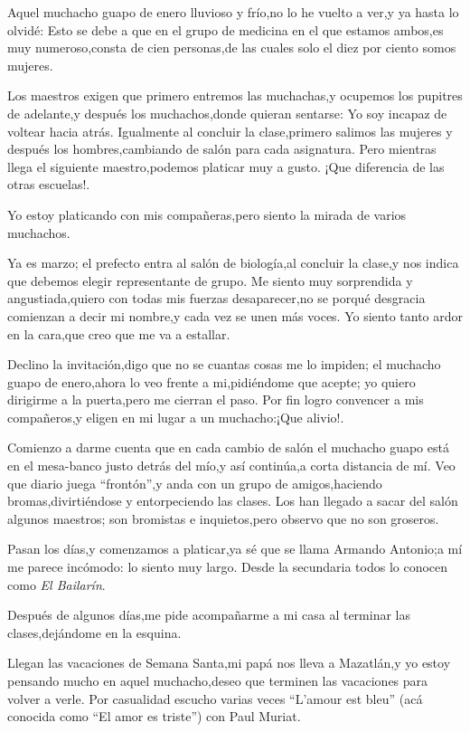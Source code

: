 \documentclass[letterpaper,12pt]{book}
\begin{document}
Aquel muchacho guapo de enero lluvioso y frío,no lo he vuelto a ver,y ya hasta lo olvidé: Esto se debe a que en el grupo de medicina en el que estamos ambos,es muy numeroso,consta de cien personas,de las cuales solo el diez por ciento somos mujeres.

Los maestros exigen que primero entremos las muchachas,y ocupemos los pupitres de adelante,y después los muchachos,donde quieran sentarse: Yo soy incapaz de voltear hacia atrás. Igualmente al concluir la clase,primero salimos las mujeres y después los hombres,cambiando de salón para cada asignatura. Pero mientras llega el siguiente maestro,podemos platicar muy a gusto. ¡Que diferencia de las otras escuelas!. 

Yo estoy platicando con mis compañeras,pero siento la mirada de varios muchachos.

Ya es marzo; el prefecto entra al salón de biología,al concluir la clase,y nos indica que debemos elegir representante de grupo. Me siento muy sorprendida y angustiada,quiero con todas mis fuerzas desaparecer,no se porqué desgracia comienzan a decir mi nombre,y cada vez se unen más voces. Yo siento tanto ardor en la cara,que creo que me va a estallar.

Declino la invitación,digo que no se cuantas cosas me lo impiden; el muchacho guapo de enero,ahora lo veo frente a mi,pidiéndome que acepte; yo quiero dirigirme a la puerta,pero me cierran el paso. Por fin logro convencer a mis compañeros,y eligen en mi lugar a un muchacho:¡Que alivio!.

Comienzo a darme cuenta que en cada cambio de salón el muchacho guapo está en el mesa-banco justo detrás del mío,y así continúa,a corta distancia de mí. Veo que diario juega ``frontón'',y anda con un grupo de amigos,haciendo bromas,divirtiéndose y entorpeciendo las clases. Los han llegado a sacar del salón algunos maestros; son bromistas e inquietos,pero observo que no son groseros.

Pasan los días,y comenzamos a platicar,ya sé que se llama Armando Antonio;a mí me parece incómodo: lo siento muy largo. Desde la secundaria todos lo conocen como {\it El Bailarín}.

Después de algunos días,me pide acompañarme a mi casa al terminar las clases,dejándome en la esquina. 

Llegan las vacaciones de Semana Santa,mi papá nos lleva a Mazatlán,y yo estoy pensando mucho en aquel muchacho,deseo que terminen las vacaciones para volver a verle. Por casualidad escucho varias veces ``L'amour est bleu'' (acá conocida como ``El amor es triste'') con Paul Muriat. 
\end{document}
